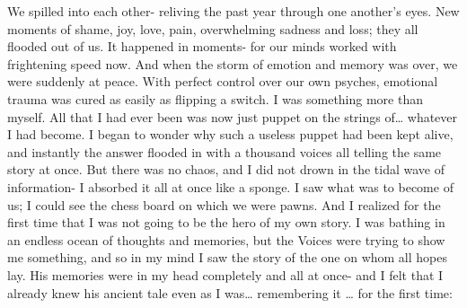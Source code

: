 \documentclass[a4paper]{article}
\begin{document}
We spilled into each other- reliving the past year through one another’s eyes. New moments of shame, joy, love, pain, overwhelming sadness and loss; they all flooded out of us. It happened in moments- for our minds worked with frightening speed now. And when the storm of emotion and memory was over, we were suddenly at peace. With perfect control over our own psyches, emotional trauma was cured as easily as flipping a switch.
I was something more than myself. All that I had ever been was now just puppet on the strings of… whatever I had become.
I began to wonder why such a useless puppet had been kept alive, and instantly the answer flooded in with a thousand voices all telling the same story at once. But there was no chaos, and I did not drown in the tidal wave of information- I absorbed it all at once like a sponge. I saw what was to become of us; I could see the chess board on which we were pawns. And I realized for the first time that I was not going to be the hero of my own story.
I was bathing in an endless ocean of thoughts and memories, but the Voices were trying to show me something, and so in my mind I saw the story of the one on whom all hopes lay. His memories were in my head completely and all at once- and I felt that I already knew his ancient tale even as I was… remembering it … for the first time:
\end{document}
